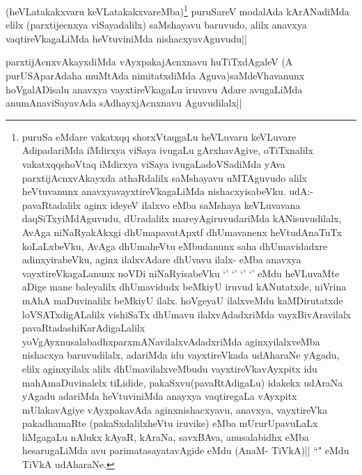 \begin{artha}
(heVLatakakxvaru keVLatakakxvareMba)\footnote{puruSa eMdare vakatxqq shorxVtaqgaLu heVLuvaru keVLuvare AdipadariMda iMdirxya viSaya ivugaLu gArxhavAgive, oTiTxnalilx vakatxqqshoVtaq iMdirxya viSaya ivugaLadoVSadiMda yAva parxtijAcnxvAkayxda athaRdalilx saMshayavu uMTAguvudo alilx heVtuvanunx anavxyavayxtireVkagaLiMda nishacxyisabeVku. udA:- pavaRtadalilx aginx ideyeV ilalxvo eMba saMshaya keVLuvavana daqSiTxyiMdAguvudu, dUradalilx mareyAgiruvudariMda kANisuvudilalx, AvAga niNaRyakAkxgi dhUmapavatApxtf dhUmavanenx heVtudAnaTuTx koLaLxbeVku, AvAga dhUmaheVtu eMbudanunx saha dhUmavidadxre adinxyirabeVku, aginx ilalxvAdare dhUvavu ilalx- eMba anavxya vayxtireVkagaLanunx noVDi niNaRyisabeVku `\stext' `\stext' `\stext' `\stext' eMdu heVLuvaMte aDige mane baleyalilx dhUmavidudx beMkiyU iruvud kANutatxde, niVrina mAhA maDuvinalilx beMkiyU ilalx. hoVgeyaU ilalxveMdu kaMDirutatxde loVSATxdigALalilx vishiSaTx dhUmavu ilalxvAdadxriMda vayxBivAravilalx pavaRtadashiKarAdigaLalilx yoVgAyxnusalabadhxparxmANavilalxvAdadxriMda aginxyilalxveMba nishacxya baruvudilalx, adariMda idu vayxtireVkada udAharaNe yAgadu, elilx aginxyilalx alilx dhUmavilalxveMbudu vayxtireVkavAyxpitx idu mahAmaDuvinalelx tiLidide, pakaSxvu(pavaRtAdigaLu) idakekx udAraNa yAgadu adariMda heVtuviniMda anayxya vaqtiregaLa vAyxpitx mUlakavAgiye vAyxpakavAda aginxnishacxyavu, anavxya, vayxtireVka pakadhamaRte (pakaSxdalilxheVtu iruvike) eMba mUrurUpavuLaLx liMgagaLu nAlukx kAyaR, kAraNa, savxBAva, anusalabidhx eMba hesarugaLiMda avu parimatasayatavAgide eMdu (AnaM- TiVkA)|| ``\stext" eMdu TiVkA udAharaNe.} puruSareV modalAda kArANadiMda elilx (parxtijecnxya viSayadalilx) saMshayavu baruvudo, alilx anavxya vaqtireVkagaLiMda heVtuviniMda nishacxyavAguvudu||
\end{artha}

\begin{artha}
parxtijAcnxvAkayxdiMda vAyxpakajAcnxnavu huTiTxdAgaleV (A purUSAparAdaha muMtAda nimitatxdiMda Aguva)saMdeVhavanunx hoVgalADisalu anavxya vayxtireVkagaLu iruvavu Adare avugaLiMda anumAnaviSayavAda sAdhayxjAcnxnavu Aguvudilalx||
\end{artha}

